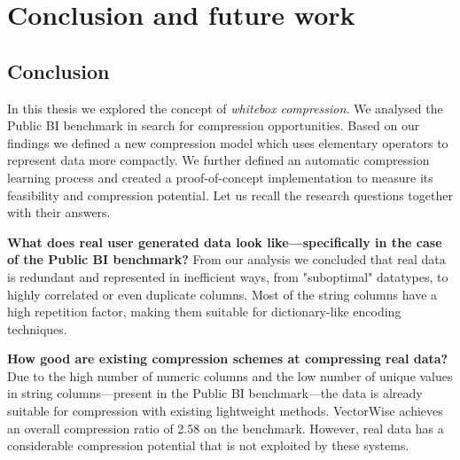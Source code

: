
\chapter{Conclusion and future work} %





% 

\section{Conclusion}

In this thesis we explored the concept of \textit{whitebox compression}. We analysed the Public BI benchmark in search for compression opportunities. Based on our findings we defined a new compression model which uses elementary operators to represent data more compactly. We further defined an automatic compression learning process and created a proof-of-concept implementation to measure its feasibility and compression potential. Let us recall the research questions together with their answers.

\textbf{What does real user generated data look like---specifically in the case of the Public BI benchmark?}
From our analysis we concluded that real data is redundant and represented in inefficient ways, from "suboptimal" datatypes, to highly correlated or even duplicate columns. Most of the string columns have a high repetition factor, making them suitable for dictionary-like encoding techniques.
\iffalse
\fi

\textbf{How good are existing compression schemes at compressing real data?} Due to the high number of numeric columns and the low number of unique values in string columns---present in the Public BI benchmark---the data is already suitable for compression with existing lightweight methods. VectorWise achieves an overall compression ratio of 2.58 on the benchmark. However, real data has a considerable compression potential that is not exploited by these systems.
\iffalse
\fi

